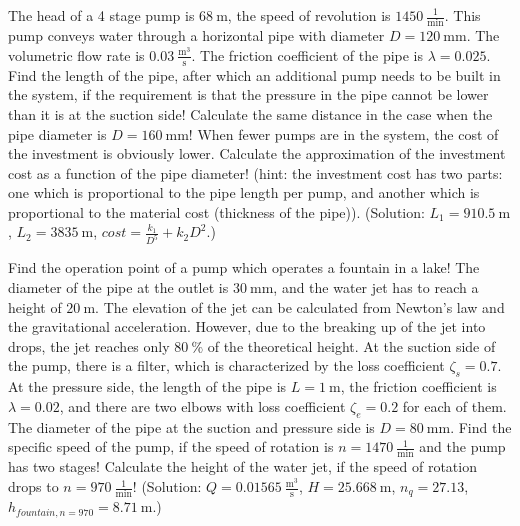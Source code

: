
\vspace{1cm}

The head of a 4 stage pump is $68~\mathrm{m}$, the speed of revolution is $1450~\frac{\mathrm{1}}{\mathrm{min}}$. This pump conveys water through a horizontal pipe with diameter $D=120~\mathrm{mm}$. The volumetric flow rate is $0.03~\frac{\mathrm{m^3}}{\mathrm{s}}$. The friction coefficient of the pipe is $\lambda=0.025$. Find the length of the pipe, after which an additional pump needs to be built in the system, if the requirement is that the pressure in the pipe cannot be lower than it is at the suction side! Calculate the same distance in the case when the pipe diameter is $D=160~\mathrm{mm}$! When fewer pumps are in the system, the cost of the investment is obviously lower. Calculate the approximation of the investment cost as a function of the pipe diameter! (hint: the investment cost has two parts: one which is proportional to the pipe length per pump, and another which is proportional to the material cost (thickness of the pipe)). (Solution: $L_1=910.5~\mathrm{m}$, $L_2 = 3835~\mathrm{m}$, $cost=\frac{k_1}{D^5} + k_2 D^2$.)


\vspace{1cm}

Find the operation point of a pump which operates a fountain in a lake! The diameter of the pipe at the outlet is $30~\mathrm{mm}$, and the water jet has to reach a height of $20~\mathrm{m}$. The elevation of the jet can be calculated from Newton's law and the gravitational acceleration. However, due to the breaking up of the jet into drops, the jet reaches only $80~\%$ of the theoretical height. At the suction side of the pump, there is a filter, which is characterized by the loss coefficient $\zeta_s=0.7$. At the pressure side, the length of the pipe is $L=1~\mathrm{m}$, the friction coefficient is $\lambda=0.02$, and there are two elbows with loss coefficient $\zeta_e=0.2$ for each of them. The diameter of the pipe at the suction and pressure side is $D=80~\mathrm{mm}$.  Find the specific speed of the pump, if the speed of rotation is $n=1470~\frac{1}{\mathrm{min}}$ and the pump has two stages! Calculate the height of the water jet, if the speed of rotation drops to $n=970~\frac{1}{\mathrm{min}}$! (Solution: $Q=0.01565~\frac{\mathrm{m^3}}{\mathrm{s}}$, $H=25.668~\mathrm{m}$, $n_q=27.13$, $h_{fountain,n=970}=8.71~\mathrm{m}$.)

